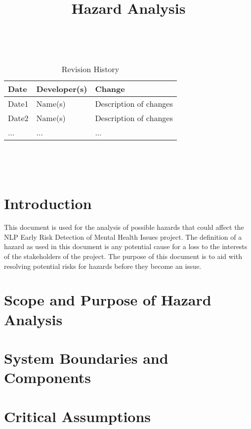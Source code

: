 \documentclass{article}
\title{Hazard Analysis\\\progname}
\author{\authname}
\date{}
\begin{document}
\maketitle
\thispagestyle{empty}

~\newpage


\begin{table}[hp]
\caption{Revision History} \label{TblRevisionHistory}
\begin{tabularx}{\textwidth}{llX}
\toprule
\textbf{Date} & \textbf{Developer(s)} & \textbf{Change}\\
\midrule
Date1 & Name(s) & Description of changes\\
Date2 & Name(s) & Description of changes\\
... & ... & ...\\
\bottomrule
\end{tabularx}
\end{table}

~\newpage

\tableofcontents

~\newpage



\section{Introduction}

This document is used for the analysis of possible hazards that could affect the NLP Early Risk Detection of Mental Health Issues project. The definition of a hazard as used in this document is any potential cause for a loss to the interests of the stakeholders of the project. The purpose of this document is to aid with resolving potential risks for hazards before they become an issue.

\section{Scope and Purpose of Hazard Analysis}

\section{System Boundaries and Components}

\section{Critical Assumptions}
\end{document}
